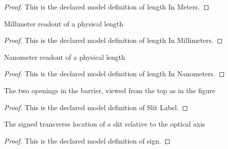 \begin{proof}
  This is the declared model definition of length In Meters.
\end{proof}
\begin{definition}
  \label{def:physics:phyx-mini-0248:phyxminiproblems-problemphyxmini0248-lengthinmillimeters}
  Millimeter readout of a physical length
\end{definition}
\begin{proof}
  This is the declared model definition of length In Millimeters.
\end{proof}
\begin{definition}
  \label{def:physics:phyx-mini-0248:phyxminiproblems-problemphyxmini0248-lengthinnanometers}
  Nanometer readout of a physical length
\end{definition}
\begin{proof}
  This is the declared model definition of length In Nanometers.
\end{proof}
\begin{definition}
  \label{def:physics:phyx-mini-0248:phyxminiproblems-problemphyxmini0248-slitlabel}
  The two openings in the barrier, viewed from the top as in the figure
\end{definition}
\begin{proof}
  This is the declared model definition of Slit Label.
\end{proof}
\begin{definition}[sign]
  \label{def:physics:phyx-mini-0248:phyxminiproblems-problemphyxmini0248-slitlabel-sign}
  The signed transverse location of a slit relative to the optical axis
\end{definition}
\begin{proof}
  This is the declared model definition of sign.
\end{proof}
